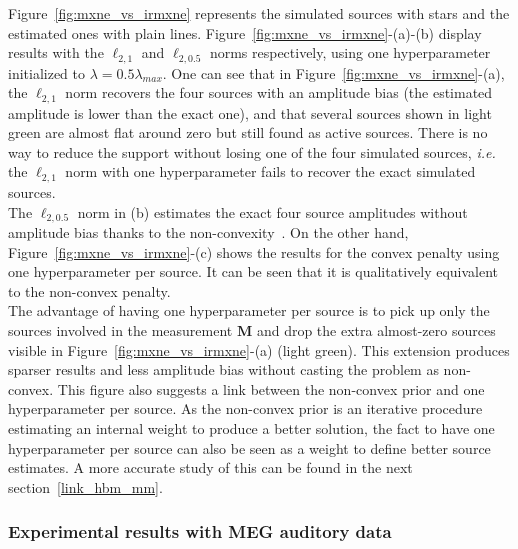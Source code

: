 Figure~\ref{fig:mxne_vs_irmxne} represents the simulated sources with stars and the estimated ones with plain lines. Figure~\ref{fig:mxne_vs_irmxne}-(a)-(b) display results with the $\ell_{2,1}$ and $\ell_{2,0.5}$ norms respectively, using one hyperparameter initialized to $\lambda=0.5\lambda_{max}$. One can see that in Figure~\ref{fig:mxne_vs_irmxne}-(a), the $\ell_{2,1}$ norm recovers the four sources with an amplitude bias (the estimated amplitude is lower than the exact one), and that several sources shown in light green are almost flat around zero but still found as active sources. There is no way to reduce the support without losing one of the four simulated sources, \textit{i.e.} the $\ell_{2,1}$ norm with one hyperparameter fails to recover the exact simulated sources.\\
The $\ell_{2,0.5}$ norm in (b) estimates the exact four source amplitudes without amplitude bias thanks to the non-convexity~\cite{strohmeier-etal:16}. On the other hand, Figure~\ref{fig:mxne_vs_irmxne}-(c) shows the results for the convex penalty using one hyperparameter per source. It can be seen that it is qualitatively equivalent to the non-convex penalty. \\


The advantage of having one hyperparameter per source is to pick up only the sources involved in the measurement $\mathbf{M}$ and drop the extra almost-zero sources visible in Figure~\ref{fig:mxne_vs_irmxne}-(a) (light green). This extension produces sparser results and less amplitude bias without casting the problem as non-convex. This figure also suggests a link between the non-convex prior and one hyperparameter per source. As the non-convex prior is an iterative procedure estimating an internal weight to produce a better solution, the fact to have one hyperparameter per source can also be seen as a weight to define better source estimates. A more accurate study of this can be found in the next section~\ref{link_hbm_mm}.


\subsubsection{Experimental results with MEG auditory data}

